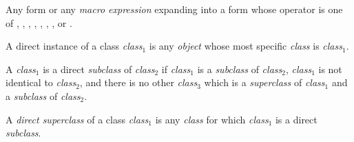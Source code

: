 \begin{optDefinition}
\begin{definitions}
     Any form or any
    {\em macro expression} expanding into a form whose operator is one of
    , , ,
    , , ,
    , or .

     A direct instance of a class
    {\em class$_1$} is any {\em object} whose most specific {\em class} is {\em
        class$_1$}.


     A {\em class$_1$} is a direct
    {\em subclass} of {\em class$_2$} if {\em class$_1$} is a {\em subclass} of
    {\em class$_2$}, {\em class$_1$} is not identical to {\em class$_2$}, and
    there is no other {\em class$_3$} which is a {\em superclass} of {\em
        class$_1$} and a {\em subclass} of {\em class$_2$}.

     
     A {\em direct superclass} of a class {\em
        class$_1$} is any {\em class} for which {\em class$_1$} is a direct {\em
        subclass}.



\end{definitions}
\end{optDefinition}

